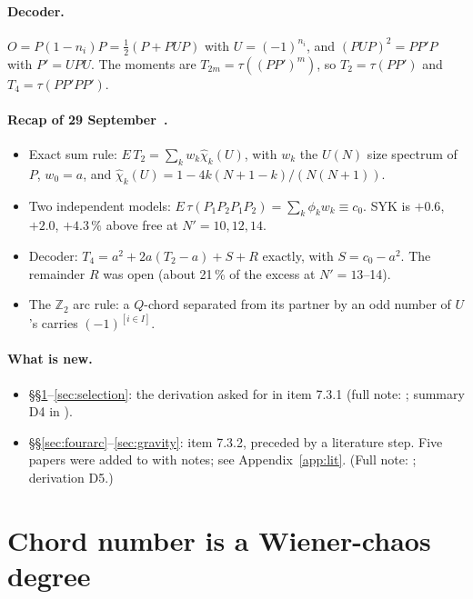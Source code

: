\documentclass[11pt]{article}
\newcommand{\Np}{N'}
\theoremstyle{remark}
\begin{document}
\paragraph{Decoder.} $O=P(1-n_i)P=\frac12(P+PUP)$ with $U=(-1)^{n_i}$, and $(PUP)^2=PP'P$ with $P'=UPU$. The moments are
$T_{2m}=\tau((PP')^m)$, so $T_2=\tau(PP')$ and $T_4=\tau(PP'PP')$.

\paragraph{Recap of 29 September~\cite{prog0929}.}
\begin{itemize}\itemsep1pt
\item Exact sum rule: $E\,T_2=\sum_kw_k\hat\chi_k(U)$, with $w_k$ the $U(N)$ size spectrum of $P$, $w_0=a$, and
  $\hat\chi_k(U)=1-4k(N+1-k)/(N(N+1))$.
\item Two independent models: $E\,\tau(P_1P_2P_1P_2)=\sum_k\phi_kw_k\equiv c_0$. SYK is $+0.6$, $+2.0$, $+4.3\,\%$ above
  free at $\Np=10,12,14$.
\item Decoder: $T_4=a^2+2a(T_2-a)+S+R$ exactly, with $S=c_0-a^2$. The remainder $R$ was open (about 21\,\% of the
  excess at $\Np=13$--14).
\item The $\mathbb Z_2$ arc rule: a $Q$-chord separated from its partner by an odd number of $U$'s carries
  $(-1)^{[i\in I]}$.
\end{itemize}

\paragraph{What is new.}
\begin{itemize}\itemsep1pt
\item \S\S\ref{sec:chaos}--\ref{sec:selection}: the derivation asked for in item 7.3.1 (full note:
  ; summary D4 in ).
\item \S\S\ref{sec:fourarc}--\ref{sec:gravity}: item 7.3.2, preceded by a literature step. Five papers were added to
   with notes; see Appendix~\ref{app:lit}. (Full note:
  ; derivation D5.)
\end{itemize}

\section{Chord number is a Wiener-chaos degree}\label{sec:chaos}
\end{document}
